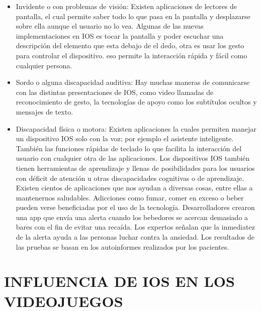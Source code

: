 \begin{itemize}
  \item Invidente o con problemas de visión:
    Existen aplicaciones de lectores de pantalla, el cual permite
    saber todo lo que pasa en la pantalla y desplazarse sobre ella
    aunque el usuario no lo vea. Algunas de las nuevas
    implementaciones en IOS es tocar la pantalla y poder escuchar
    una descripción del elemento que esta debajo de el dedo, otra es
    usar los gesto para controlar el dispositivo. eso permite la
    interacción rápida y fácil como cualquier persona.
  \item Sordo o alguna discapacidad auditiva:
    Hay muchas maneras de comunicarse con las distintas   
    presentaciones de IOS, como video llamadas de reconocimiento
    de gesto, la tecnologías de apoyo como los subtítulos ocultos y
    mensajes de texto.
  \item Discapacidad física o motora:
    Existen aplicaciones la cuales permiten manejar un dispositivo
    IOS solo con la voz; por ejemplo el asistente inteligente.
    También las funciones rápidas de teclado lo que facilita la
    interacción del usuario con cualquier otra de las aplicaciones.
    Los dispositivos IOS también tienen herramientas de
    aprendizaje y llenas de posibilidades para los usuarios con
    déficit de atención u otras discapacidades cognitivas o de
    aprendizaje.
    Existen cientos de aplicaciones que nos ayudan a diversas cosas,
    entre ellas a mantenernos saludables. Adicciones como fumar,
    comer en exceso o beber pueden verse beneficiadas por el uso
    de la tecnología. Desarrolladores crearon una app que envía una
    alerta cuando los bebedores se acercan demasiado a bares con
    el fin de evitar una recaída. Los expertos señalan que la
    inmediatez de la alerta ayuda a las personas luchar contra la
    ansiedad. Los resultados de las pruebas se basan en los autoinformes
    realizados por los pacientes.
\end{itemize}

\section*{INFLUENCIA DE IOS EN LOS VIDEOJUEGOS}

